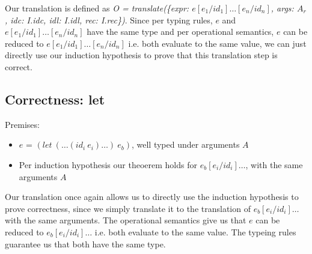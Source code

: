 \documentclass[letterpaper,12pt]{article}
\begin{document}
Our translation is defined as 
\textit{O = translate(\{expr: $e[e_1 / id_1]\dots[e_n / id_n]$, args: $A_r$,
idc: I.idc, idl: I.idl, rec: I.rec\})}. Since per typing rules,
$e$ and $e[e_1 / id_1]\dots[e_n / id_n]$ have the same type and
per operational semantics, $e$ can be reduced to
$e[e_1 / id_1]\dots[e_n / id_n]$ i.e. both evaluate to the same value,
we can just directly use our induction hypothesis to prove that
this translation step is correct.

\subsection{Correctness: let}

Premises:
\begin{itemize}
	\item $e$ = $(let\: (\dots(id_i\: e_i)\dots)\: e_b)$, well typed
		under arguments $A$
	\item Per induction hypothesis our theoerem
		holds for $e_b[e_i / id_i]\dots$, with the same arguments $A$
\end{itemize}

Our translation once again allows us to directly use the induction
hypothesis to prove correctness, since we simply translate it to
the translation of $e_b[e_i / id_i]\dots$ with the same arguments.
The operational semantics give us that $e$ can be reduced to
$e_b[e_i / id_i]\dots$ i.e. both evaluate to the same value.
The typeing rules guarantee us that both have the same type.

% 
\end{document}
